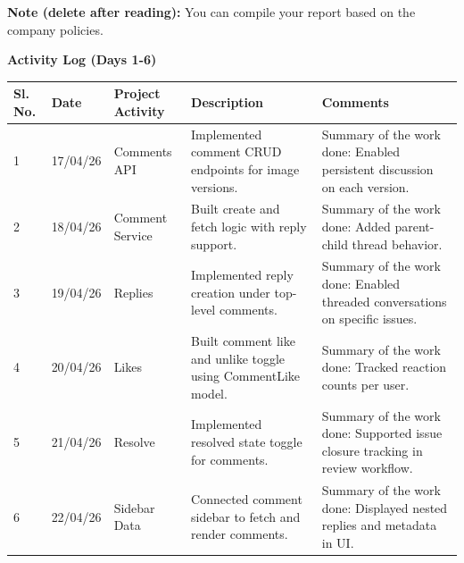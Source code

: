 \documentclass[12pt,a4paper]{article}
\begin{document}
{\color{red}\small\textbf{Note (delete after reading):} You can compile your report based on the company policies.}
\vspace{0.25cm}
\begin{center}{\large\bfseries Activity Log (Days 1-6)}\end{center}
\begin{tabular}{|p{}|p{}|p{}|p{}|p{}|}\hline
\centering\textbf{Sl. No.} & \centering\textbf{Date} & \centering\textbf{Project Activity} & \centering\textbf{Description} & \centering\textbf{Comments} \tabularnewline\hline
1 & 17/04/26 & Comments API & Implemented comment CRUD endpoints for image versions. &
Summary of the work done:\newline
Enabled persistent discussion on each version. \\ \hline
2 & 18/04/26 & Comment Service & Built create and fetch logic with reply support. &
Summary of the work done:\newline
Added parent-child thread behavior. \\ \hline
3 & 19/04/26 & Replies & Implemented reply creation under top-level comments. &
Summary of the work done:\newline
Enabled threaded conversations on specific issues. \\ \hline
4 & 20/04/26 & Likes & Built comment like and unlike toggle using CommentLike model. &
Summary of the work done:\newline
Tracked reaction counts per user. \\ \hline
5 & 21/04/26 & Resolve & Implemented resolved state toggle for comments. &
Summary of the work done:\newline
Supported issue closure tracking in review workflow. \\ \hline
6 & 22/04/26 & Sidebar Data & Connected comment sidebar to fetch and render comments. &
Summary of the work done:\newline
Displayed nested replies and metadata in UI. \\ \hline
\end{tabular}

\newpage
\end{document}
